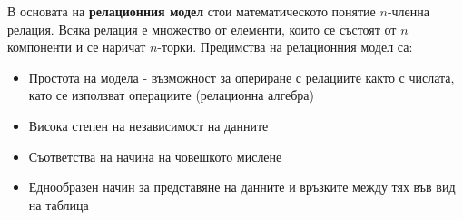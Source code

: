 \documentclass{article}
\begin{document}
В основата на \textbf{релационния модел} стои математическото понятие $n$-членна релация. Всяка релация е множество от елементи, които се състоят от
$n$ компоненти и се наричат $n$-торки. Предимства на релационния модел са:
\begin{itemize}
    \item Простота на модела - възможност за опериране с релациите както с числата, като се използват операциите (релационна алгебра)
    \item Висока степен на независимост на данните
    \item Съответства на начина на човешкото мислене
    \item Еднообразен начин за представяне на данните и връзките между тях във вид на таблица
\end{itemize}
\end{document}
